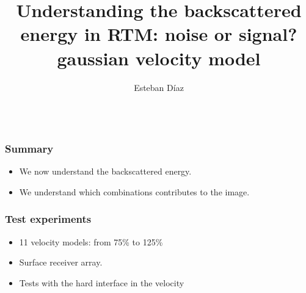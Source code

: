 




\title[]{Understanding the backscattered energy in RTM: noise or signal?\\ gaussian velocity model}
\subtitle{}
\author[]{Esteban  D\'{i}az}
\date{}
\logo{}

\def\big#1{\begin{center} \LARGE \textbf{#1} \end{center}}
\def\cen#1{\begin{center}        \textbf{#1} \end{center}}


\setlength{\unitlength}{0.1cm} 

 { \cwpcover }









 \begin{frame} 

 \begin{columns} 
      
   \end{columns}
\end{frame}

\begin{frame} \frametitle{Summary}
\begin{itemize}
    \item We now understand the backscattered energy.
    \item We understand which combinations contributes to the image.
\end{itemize}
\end{frame}


\begin{frame} \frametitle{Test experiments}
\begin{itemize}
   \item 11 velocity models: from 75\% to 125\%
   \item Surface receiver array.
   \item Tests with the hard interface in the velocity
\end{itemize}
\end{frame}
\cwpnote{}

